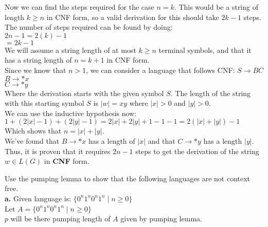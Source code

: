 \documentclass[12pt]{article}
\begin{document}
Now we can find the steps required for the case $n = k$. This would be a string of length
$k \geq n$ in CNF form, so a valid derivation for this should take $2k - 1$ steps. \\

The number of steps required can be found by doing: \\
$2n - 1 = 2(k) - 1$ \\
$       = 2k - 1 $ \\

We will assume a string length of at most $k \geq n$ terminal symbols, and that it has a string
length of $n = k + 1$ in CNF form. \\

Since we know that $n > 1$, we can consider a language that follows CNF:
$S \rightarrow BC$ \\
$B \rightarrow *x$ \\
$C \rightarrow *y$ \\

Where the derivation starts with the given symbol $S$. The length of the string with
this starting symbol $S$ is $|w| = xy$ where $|x| > 0$ and $|y| > 0$. \\

We can use the inductive hypothesis now: \\

$1 + (2 |x| - 1) + (2 |y| - 1) = 2|x| + 2|y| + 1 - 1 - 1 = 2 (|x| + |y|) - 1 $ \\

Which shows that $n = |x| + |y|$. \\

We've found that $B \rightarrow *x$ has a length of $|x|$ and that $C \rightarrow *y$
has a length $|y|$. Thus, it is proven that it requires $2n - 1$ steps to get the
derivation of the string $w \in L(G)$ in \textbf{CNF} form.

 Use the pumping lemma to show that the following languages are not context free. \\

\textbf{a.} Given language is: $ \{0^n 1^n 0^n 1^n \; | \; n \geq 0 \} $ \\

Let $A = \{0^n 1^n 0^n 1^n \; | \; n \geq 0 \} $ \\
$p$ will be there pumping length of $A$ given by pumping lemma. \\
\end{document}
